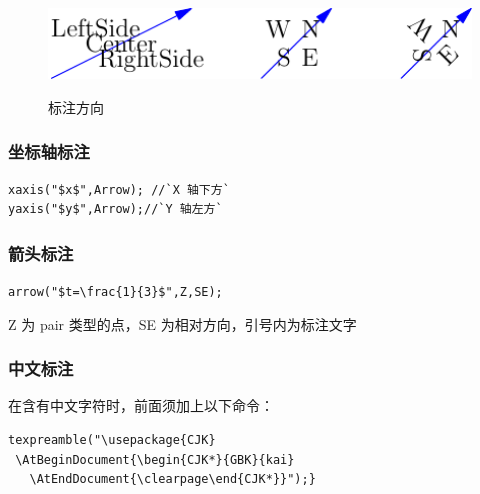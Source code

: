  

\begin{figure}[htbp]
  \centering
  \includegraphics[width=14cm]{body/asycode/label}\\
  \caption{标注方向}\label{label}
\end{figure}


\subsubsection{坐标轴标注}

\begin{lstlisting}
xaxis("$x$",Arrow); //`X 轴下方`
yaxis("$y$",Arrow);//`Y 轴左方` 
\end{lstlisting}



\subsubsection{箭头标注}
\color{red}
\verb|arrow("$t=\frac{1}{3}$",Z,SE);|
\normalcolor

Z 为 pair 类型的点，SE 为相对方向，引号内为标注文字

\subsubsection{中文标注}

在含有中文字符时，前面须加上以下命令：
\begin{lstlisting}
texpreamble("\usepackage{CJK}
 \AtBeginDocument{\begin{CJK*}{GBK}{kai}
   \AtEndDocument{\clearpage\end{CJK*}}");}
\end{lstlisting}

\clearpage
